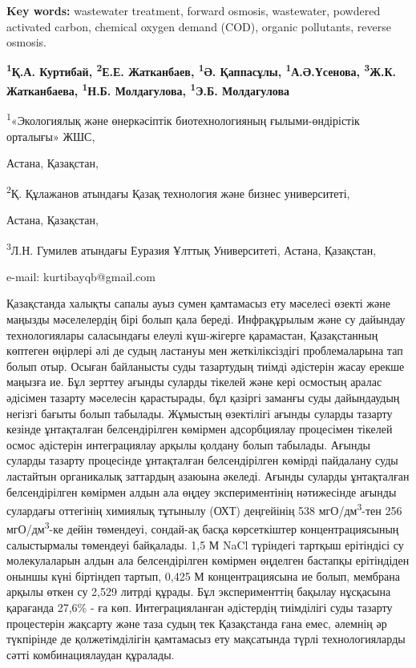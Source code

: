 {\bfseries Key words:} wastewater treatment, forward osmosis, wastewater,
powdered activated carbon, chemical oxygen demand (COD), organic
pollutants, reverse osmosis.


\begin{center}
{\bfseries \textsuperscript{1}Қ.А. Куртибай\envelope, \textsuperscript{2}Е.Е.
Жатканбаев, \textsuperscript{1}Ә. Қаппасұлы,
\textsuperscript{1}А.Ә.Үсенова, \textsuperscript{3}Ж.К. Жатканбаева, \textsuperscript{1}Н.Б.
Молдагулова, \textsuperscript{1}Э.Б. Молдагулова}

\textsuperscript{1}«Экологиялық және өнеркәсіптік биотехнологияның
ғылыми-өндірістік орталығы» ЖШС,

Астана, Қазақстан,

\textsuperscript{2}Қ. Құлажанов атындағы Қазақ технология және бизнес
университеті,

Астана, Қазақстан,

\textsuperscript{3}Л.Н. Гумилев атындағы Еуразия Ұлттық Университеті,
Астана, Қазақстан,

e-mail: kurtibayqb@gmail.com
\end{center}

Қазақстанда халықты сапалы ауыз сумен қамтамасыз ету мәселесі өзекті
және маңызды мәселелердің бірі болып қала береді. Инфрақұрылым және су
дайындау технологиялары саласындағы елеулі күш-жігерге қарамастан,
Қазақстанның көптеген өңірлері әлі де судың ластануы мен жеткіліксіздігі
проблемаларына тап болып отыр. Осыған байланысты суды тазартудың тиімді
әдістерін жасау ерекше маңызға ие. Бұл зерттеу ағынды суларды тікелей
және кері осмостың аралас әдісімен тазарту мәселесін қарастырады, бұл
қазіргі заманғы суды дайындаудың негізгі бағыты болып табылады. Жұмыстың
өзектілігі ағынды суларды тазарту кезінде ұнтақталған белсендірілген
көмірмен адсорбциялау процесімен тікелей осмос әдістерін интеграциялау
арқылы қолдану болып табылады. Ағынды суларды тазарту процесінде
ұнтақталған белсендірілген көмірді пайдалану суды ластайтын органикалық
заттардың азаюына әкеледі. Ағынды суларды ұнтақталған белсендірілген
көмірмен алдын ала өңдеу экспериментінің нәтижесінде ағынды сулардағы
оттегінің химиялық тұтынылу (ОХТ) деңгейінің 538
мгО/дм\textsuperscript{3}-тен 256 мгО/дм\textsuperscript{3}-ке дейін
төмендеуі, сондай-ақ басқа көрсеткіштер концентрациясының салыстырмалы
төмендеуі байқалады. 1,5 М NaCl түріндегі тартқыш ерітіндісі су
молекулаларын алдын ала белсендірілген көмірмен өңделген бастапқы
ерітіндіден оныншы күні біртіндеп тартып, 0,425 М концентрациясына ие
болып, мембрана арқылы өткен су 2,529 литрді құрады. Бұл эксперименттің
бақылау нұсқасына қарағанда 27,6\% - ға көп. Интеграцияланған әдістердің
тиімділігі суды тазарту процестерін жақсарту және таза судың тек
Қазақстанда ғана емес, әлемнің әр түкпірінде де қолжетімділігін
қамтамасыз ету мақсатында түрлі технологияларды сәтті комбинациялаудан
құралады.

